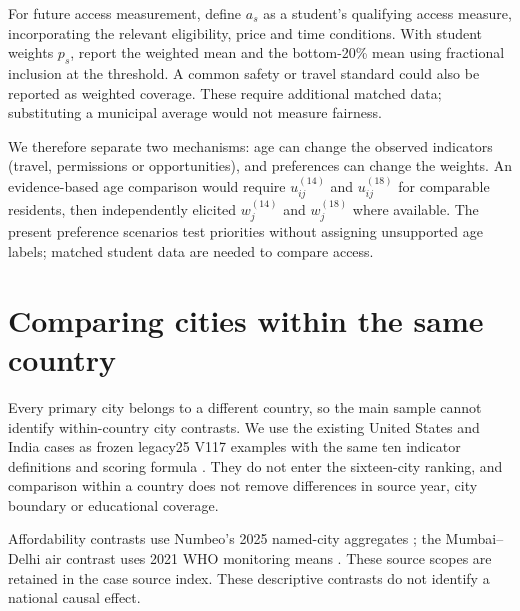 For future access measurement, define $a_s$ as a student's qualifying access
measure, incorporating the relevant eligibility, price and time conditions.
With student weights $p_s$, report the weighted mean and the bottom-20\%
mean using fractional inclusion at the threshold. A common safety or travel
standard could also be reported as weighted coverage. These require additional
matched data; substituting a municipal average would not measure fairness.

\AgeCase
We therefore separate two mechanisms: age can change the observed indicators
(travel, permissions or opportunities), and preferences can change the weights.
An evidence-based age comparison would require $u_{ij}^{(14)}$ and
$u_{ij}^{(18)}$ for comparable residents, then independently elicited
$w_j^{(14)}$ and $w_j^{(18)}$ where available. The present preference scenarios
test priorities without assigning unsupported age labels; matched student data
are needed to compare access.

\section{Comparing cities within the same country}
Every primary city belongs to a different country, so the main sample cannot
identify within-country city contrasts. We use the existing United States and
India cases as frozen legacy25 V117 examples with the same ten indicator
definitions and scoring formula \cite{legacycase}. They do not enter the sixteen-city ranking,
and comparison within a country does not remove differences in source year,
city boundary or educational coverage.



\CountryInterpretation
Affordability contrasts use Numbeo's 2025 named-city aggregates
\cite{numbeocase}; the Mumbai--Delhi air contrast uses 2021 WHO monitoring
means \cite{whocase}. These source scopes are retained in the case source index.
These descriptive contrasts do not identify a national causal effect.
